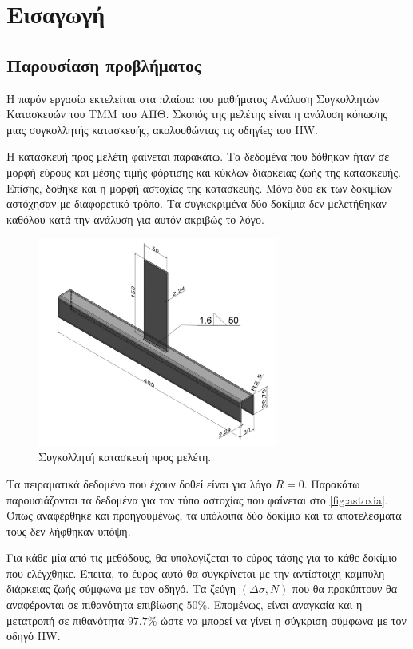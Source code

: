 \documentclass{article}
\begin{document}



\tableofcontents

\section{Εισαγωγή}
\subsection{Παρουσίαση προβλήματος}
Η παρόν εργασία εκτελείται στα πλαίσια του μαθήματος Ανάλυση Συγκολλητών Κατασκευών του ΤΜΜ του ΑΠΘ. Σκοπός της μελέτης είναι η ανάλυση κόπωσης μιας συγκολλητής κατασκευής, ακολουθώντας τις οδηγίες του IIW. 
\par Η κατασκευή προς μελέτη φαίνεται παρακάτω. Τα δεδομένα που δόθηκαν ήταν σε μορφή εύρους και μέσης τιμής φόρτισης και κύκλων διάρκειας ζωής της κατασκευής. Επίσης, δόθηκε και η μορφή αστοχίας της κατασκευής. Μόνο δύο εκ των δοκιμίων αστόχησαν με διαφορετικό τρόπο. Τα συγκεκριμένα δύο δοκίμια δεν μελετήθηκαν καθόλου κατά την ανάλυση για αυτόν ακριβώς το λόγο.
\begin{figure}[H]
    \centering
    \includegraphics[width = 0.7\textwidth]{media/ditr.png}
    \caption{Συγκολλητή κατασκευή προς μελέτη.}
    \label{fig: ditr}
\end{figure}

Τα πειραματικά δεδομένα που έχουν δοθεί είναι για λόγο $R = 0$. Παρακάτω παρουσιάζονται τα δεδομένα για τον τύπο αστοχίας που φαίνεται στο \ref{fig:astoxia}. Όπως αναφέρθηκε και προηγουμένως, τα υπόλοιπα δύο δοκίμια και τα αποτελέσματα τους δεν λήφθηκαν υπόψη.
\par Για κάθε μία από τις μεθόδους, θα υπολογίζεται το εύρος τάσης για το κάθε δοκίμιο που ελέγχθηκε. Έπειτα, το έυρος αυτό θα συγκρίνεται με την αντίστοιχη καμπύλη διάρκειας ζωής σύμφωνα με τον οδηγό. Τα ζεύγη $(\Delta \sigma, N)$ που θα προκύπτουν θα αναφέρονται σε πιθανότητα επιβίωσης $50\%$. Επομένως, είναι αναγκαία και η μετατροπή σε πιθανότητα $97.7\%$ ώστε να μπορεί να γίνει η σύγκριση σύμφωνα με τον οδηγό IIW.
\end{document}
